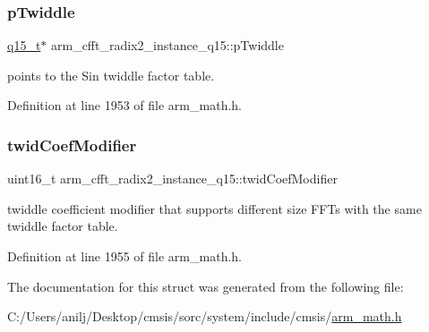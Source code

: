 \subsubsection{\texorpdfstring{p\+Twiddle}{pTwiddle}}
{\footnotesize\ttfamily \hyperlink{arm__math_8h_ab5a8fb21a5b3b983d5f54f31614052ea}{q15\+\_\+t}$\ast$ arm\+\_\+cfft\+\_\+radix2\+\_\+instance\+\_\+q15\+::p\+Twiddle}

points to the Sin twiddle factor table. 

Definition at line 1953 of file arm\+\_\+math.\+h.

\mbox{\label{structarm__cfft__radix2__instance__q15_a6f2ab87fb4c568656e1f92f687b5c850}} 
\subsubsection{\texorpdfstring{twid\+Coef\+Modifier}{twidCoefModifier}}
{\footnotesize\ttfamily uint16\+\_\+t arm\+\_\+cfft\+\_\+radix2\+\_\+instance\+\_\+q15\+::twid\+Coef\+Modifier}

twiddle coefficient modifier that supports different size F\+F\+Ts with the same twiddle factor table. 

Definition at line 1955 of file arm\+\_\+math.\+h.



The documentation for this struct was generated from the following file\+:\begin{DoxyCompactItemize}
\item 
C\+:/\+Users/anilj/\+Desktop/cmsis/sorc/system/include/cmsis/\hyperlink{arm__math_8h}{arm\+\_\+math.\+h}\end{DoxyCompactItemize}
